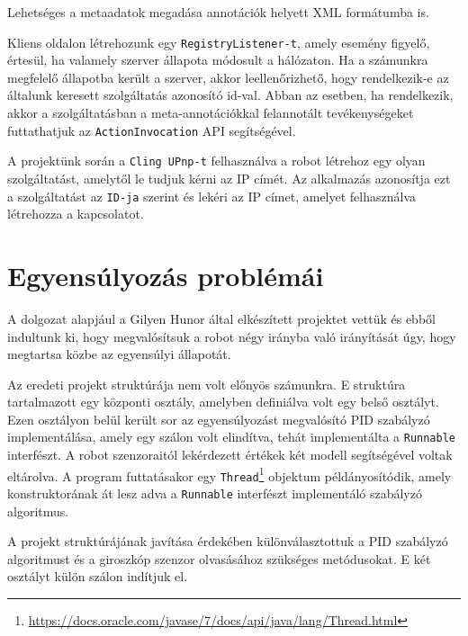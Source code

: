 Lehetséges a metaadatok megadása annotációk helyett XML formátumba is. 



Kliens oldalon létrehozunk egy \texttt{RegistryListener-t}, amely esemény figyelő, értesül, ha valamely szerver állapota módosult a hálózaton. Ha a számunkra megfelelő állapotba került a szerver, akkor leellenőrizhető, hogy rendelkezik-e az általunk keresett szolgáltatás azonosító id-val. Abban az esetben, ha rendelkezik, akkor a szolgáltatásban a meta-annotációkkal felannotált tevékenységeket futtathatjuk az \texttt{ActionInvocation} API segítségével.

A projektünk során a \texttt{Cling UPnp-t} felhasználva a robot létrehoz egy olyan szolgáltatást, amelytől le tudjuk kérni az IP címét. Az alkalmazás azonosítja ezt a szolgáltatást az \texttt{ID-ja} szerint és lekéri az IP címet, amelyet felhasználva létrehozza a kapcsolatot.

\section{Egyensúlyozás problémái}\label{sec:MEGVALOSITAS:pidModositas}

A dolgozat alapjául a Gilyen Hunor által elkészített projektet vettük és ebből indultunk ki, hogy megvalósítsuk a robot négy irányba való irányítását úgy, hogy megtartsa közbe az egyensúlyi állapotát.

Az eredeti projekt struktúrája nem volt előnyös számunkra. E struktúra tartalmazott egy központi osztály, amelyben definiálva volt egy belső osztályt. Ezen osztályon belül került sor az egyensúlyozást megvalósító PID szabályzó implementálása, amely egy szálon volt elindítva, tehát implementálta a \texttt{Runnable} interfészt. A robot szenzoraitól lekérdezett értékek két modell segítségével voltak eltárolva. A program futtatásakor egy \texttt{Thread}\footnote{\href{https://docs.oracle.com/javase/7/docs/api/java/lang/Thread.html}{https://docs.oracle.com/javase/7/docs/api/java/lang/Thread.html}} objektum példányosítódik, amely konstruktorának át lesz adva a \texttt{Runnable} interfészt implementáló szabályzó algoritmus.

A projekt struktúrájának javítása érdekében különválasztottuk a PID szabályzó algoritmust és a giroszkóp szenzor olvasásához szükséges metódusokat. E két osztályt külön szálon indítjuk el. 

